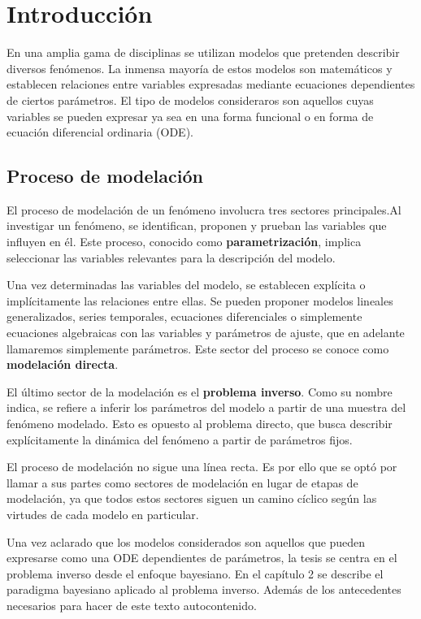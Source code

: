 \chapter{Introducción}

En una amplia gama de disciplinas se utilizan modelos que pretenden describir diversos fenómenos. La inmensa mayoría de estos modelos son matemáticos y establecen relaciones entre variables expresadas mediante ecuaciones dependientes de ciertos parámetros. El tipo de modelos consideraros son aquellos cuyas variables se pueden expresar ya sea en una forma funcional o en forma de ecuación diferencial ordinaria (ODE).

\section{Proceso de modelación}

El proceso de modelación de un fenómeno involucra tres sectores principales.Al investigar un fenómeno, se identifican, proponen y prueban las variables que influyen en él. Este proceso, conocido como \textbf{parametrización}, implica seleccionar las variables relevantes para la descripción del modelo.

Una vez determinadas las variables del modelo, se establecen explícita o implícitamente las relaciones entre ellas. Se pueden proponer modelos lineales generalizados, series temporales, ecuaciones diferenciales o simplemente ecuaciones algebraicas con las variables y parámetros de ajuste, que en adelante llamaremos simplemente parámetros. Este sector del proceso se conoce como \textbf{modelación directa}.

El último sector de la modelación es el \textbf{problema inverso}. Como su nombre indica, se refiere a inferir los parámetros del modelo a partir de una muestra del fenómeno modelado. Esto es opuesto al problema directo, que busca describir explícitamente la dinámica del fenómeno a partir de parámetros fijos. 

El proceso de modelación no sigue una línea recta. Es por ello que se optó por llamar a sus partes como sectores de modelación en lugar de etapas de modelación, ya que todos estos sectores siguen un camino cíclico según las virtudes de cada modelo en particular. 

Una vez aclarado que los modelos considerados son aquellos que pueden expresarse como una ODE dependientes de parámetros, la tesis se centra en el problema inverso desde el enfoque bayesiano. En el capítulo 2 se describe el paradigma bayesiano aplicado al problema inverso. Además de los antecedentes necesarios para hacer de este texto autocontenido. 

